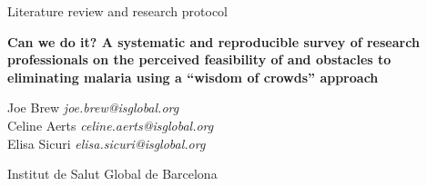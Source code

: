 \documentclass{article}
\begin{document}


\vspace{20mm}


\begin{Large}
\begin{center}
Literature review and research protocol
\end{center}
\end{Large}


\begin{large}
\begin{center}
\textbf{Can we do it? A systematic and reproducible survey of research professionals on the perceived feasibility of and obstacles to eliminating malaria using a “wisdom of crowds” approach} 
\end{center}
\end{large}


\vspace{5mm}

\begin{changemargin}{2.5cm}{2.5cm} 
\begin{center}
\begin{large}
Joe Brew \hfill \emph{joe.brew@isglobal.org} \\
Celine Aerts \hfill \emph{celine.aerts@isglobal.org } \\ 
Elisa Sicuri \hfill \emph{elisa.sicuri@isglobal.org} \\ 
\end{large}
\end{center}
\end{changemargin}


\vspace{6mm}

\begin{center}
\begin{large}
Institut de Salut Global de Barcelona 
\end{large}
\end{center}
\end{document}
